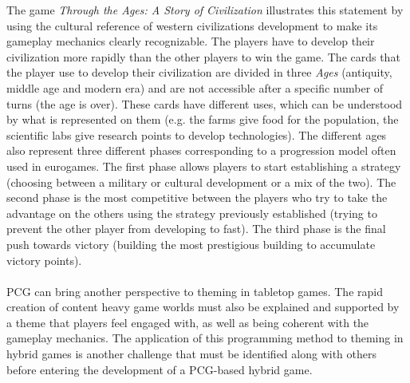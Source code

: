 The game \textit{{Through the Ages: A Story of Civilization}}\cite{game:ages} illustrates this statement by using the cultural reference of western civilizations development to make its gameplay mechanics clearly recognizable. The players have to develop their civilization more rapidly than the other players to win the game. The cards that the player use to develop their civilization are divided in three \textit{Ages} (antiquity, middle age and modern era) and are not accessible after a specific number of turns (the age is over). These cards have different uses, which can be understood by what is represented on them (e.g. the farms give food for the population, the scientific labs give research points to develop technologies). The different ages also represent three different phases corresponding to a progression model often used in eurogames. The first phase allows players to start establishing a strategy (choosing between a military or cultural development or a mix of the two). The second phase is the most competitive between the players who try to take the advantage on the others using the strategy previously established (trying to prevent the other player from developing to fast). The third phase is the final push towards victory (building the most prestigious building to accumulate victory points).\\\\
PCG can bring another perspective to theming in tabletop games. The rapid creation of content heavy game worlds must also be explained and supported by a theme that players feel engaged with, as well as being coherent with the gameplay mechanics. The application of this programming method to theming in hybrid games is another challenge that must be identified along with others before entering the development of a PCG-based hybrid game.

